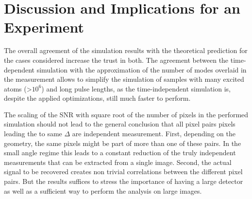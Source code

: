
\section{Discussion and Implications for an Experiment}
The overall agreement of the simulation results with the theoretical prediction for the cases considered increase the trust in both. The agreement between the time-dependent simulation with the approximation of the number of modes overlaid in the measurement allows to simplify the simulation of samples with many excited atoms (>$10^6$) and long pulse lengths, as the time-independent simulation is, despite the applied optimizations, still much faster to perform.

The scaling of the SNR with square root of the number of pixels in the performed simulation should not lead to the general conclusion that all pixel pairs pixels leading the to same $\Delta $ are independent measurement. First, depending on the geometry, the same pixels might be part of more than one of these pairs. In the small angle regime this leads to a constant reduction of the truly independent measurements that can be extracted from a single image. Second, the actual signal to be recovered creates non trivial correlations between the different pixel pairs. But the results suffices to stress the importance of having a large detector as well as a sufficient way to perform the analysis on large images.

